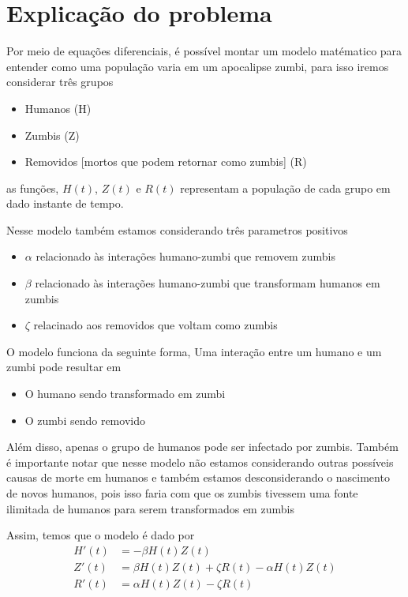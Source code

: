 \documentclass[a4paper, 11pt]{article}
\begin{document}
\begin{center}
\end{center}

\section{Explicação do problema}
Por meio de equações diferenciais, é possível montar um modelo matématico para entender como uma população varia em um apocalipse zumbi, para isso iremos considerar três grupos
\begin{itemize}[label=-]
    \item Humanos (H)
    \item Zumbis (Z)
    \item Removidos [mortos que podem retornar como zumbis] (R)
\end{itemize}
as funções, $H(t)$, $Z(t)$ e $R(t)$ representam a população de cada grupo em dado instante de tempo.

Nesse modelo também estamos considerando três parametros positivos
\begin{itemize}[label=-]
    \item $\alpha$ relacionado às interações humano-zumbi que removem zumbis
    \item $\beta$ relacionado às interações humano-zumbi que transformam humanos em zumbis
    \item $\zeta$ relacinado aos removidos que voltam como zumbis
\end{itemize}

O modelo funciona da seguinte forma, Uma interação entre um humano e um zumbi pode resultar em
\begin{itemize}[label=-]
    \item O humano sendo transformado em zumbi
    \item O zumbi sendo removido
\end{itemize}
Além disso, apenas o grupo de humanos pode ser infectado por zumbis.
Também é importante notar que nesse modelo não estamos considerando outras possíveis causas de morte em humanos e também estamos desconsiderando o nascimento de novos humanos, pois isso faria com que os zumbis tivessem uma fonte ilimitada de humanos para serem transformados em zumbis

Assim, temos que o modelo é dado por
\begin{align*}
    H'(t) &= -\beta H(t) Z(t)\\
    Z'(t) &= \beta H(t) Z(t) + \zeta R(t) - \alpha H(t) Z(t)\\
    R'(t) &= \alpha H(t) Z(t) - \zeta R(t)
\end{align*}
\end{document}
